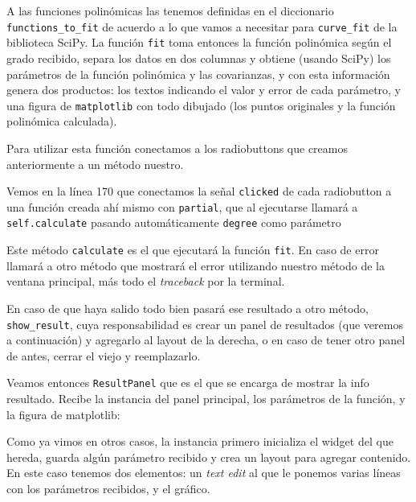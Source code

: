 
A las funciones polinómicas las tenemos definidas en el diccionario \texttt{functions\_to\_fit} de acuerdo a lo que vamos a necesitar para \texttt{curve\_fit} de la biblioteca SciPy. La función \texttt{fit} toma entonces la función polinómica según el grado recibido, separa los datos en dos columnas y obtiene (usando SciPy) los parámetros de la función polinómica y las covarianzas, y con esta información genera dos productos: los textos indicando el valor y error de cada parámetro, y una figura de \texttt{matplotlib} con todo dibujado (los puntos originales y la función polinómica calculada).

Para utilizar esta función conectamos a los radiobuttons que creamos anteriormente a un método nuestro.


Vemos en la línea 170 que conectamos la señal \texttt{clicked} de cada radiobutton a una función creada ahí mismo con \texttt{partial}, que al ejecutarse llamará a \texttt{self.calculate} pasando automáticamente \texttt{degree} como parámetro


Este método \texttt{calculate} es el que ejecutará la función \texttt{fit}. En caso de error llamará a otro método que mostrará el error utilizando nuestro método de la ventana principal, más todo el \textit{traceback} por la terminal. 

En caso de que haya salido todo bien pasará ese resultado a otro método, \texttt{show\_result}, cuya responsabilidad es crear un panel de resultados (que veremos a continuación) y agregarlo al layout de la derecha, o en caso de tener otro panel de antes, cerrar el viejo y reemplazarlo. 

Veamos entonces \texttt{ResultPanel} que es el que se encarga de mostrar la info resultado. Recibe la instancia del panel principal, los parámetros de la función, y la figura de matplotlib:


Como ya vimos en otros casos, la instancia primero inicializa el widget del que hereda, guarda algún parámetro recibido y crea un layout para agregar contenido. En este caso tenemos dos elementos: un \textit{text edit} al que le ponemos varias líneas con los parámetros recibidos, y el gráfico.

